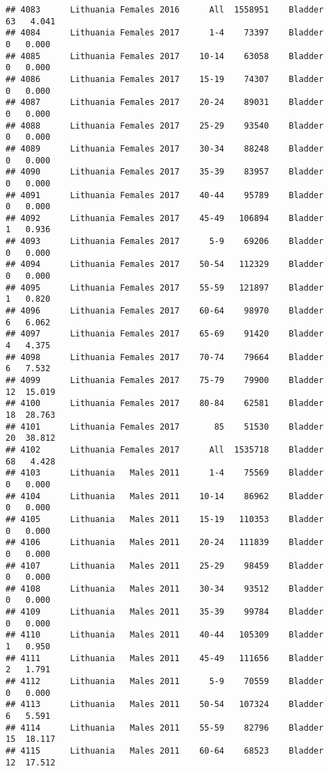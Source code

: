 \documentclass[
]{article}
\begin{document}
\begin{verbatim}
## 4083      Lithuania Females 2016      All  1558951    Bladder     63   4.041
## 4084      Lithuania Females 2017      1-4    73397    Bladder      0   0.000
## 4085      Lithuania Females 2017    10-14    63058    Bladder      0   0.000
## 4086      Lithuania Females 2017    15-19    74307    Bladder      0   0.000
## 4087      Lithuania Females 2017    20-24    89031    Bladder      0   0.000
## 4088      Lithuania Females 2017    25-29    93540    Bladder      0   0.000
## 4089      Lithuania Females 2017    30-34    88248    Bladder      0   0.000
## 4090      Lithuania Females 2017    35-39    83957    Bladder      0   0.000
## 4091      Lithuania Females 2017    40-44    95789    Bladder      0   0.000
## 4092      Lithuania Females 2017    45-49   106894    Bladder      1   0.936
## 4093      Lithuania Females 2017      5-9    69206    Bladder      0   0.000
## 4094      Lithuania Females 2017    50-54   112329    Bladder      0   0.000
## 4095      Lithuania Females 2017    55-59   121897    Bladder      1   0.820
## 4096      Lithuania Females 2017    60-64    98970    Bladder      6   6.062
## 4097      Lithuania Females 2017    65-69    91420    Bladder      4   4.375
## 4098      Lithuania Females 2017    70-74    79664    Bladder      6   7.532
## 4099      Lithuania Females 2017    75-79    79900    Bladder     12  15.019
## 4100      Lithuania Females 2017    80-84    62581    Bladder     18  28.763
## 4101      Lithuania Females 2017       85    51530    Bladder     20  38.812
## 4102      Lithuania Females 2017      All  1535718    Bladder     68   4.428
## 4103      Lithuania   Males 2011      1-4    75569    Bladder      0   0.000
## 4104      Lithuania   Males 2011    10-14    86962    Bladder      0   0.000
## 4105      Lithuania   Males 2011    15-19   110353    Bladder      0   0.000
## 4106      Lithuania   Males 2011    20-24   111839    Bladder      0   0.000
## 4107      Lithuania   Males 2011    25-29    98459    Bladder      0   0.000
## 4108      Lithuania   Males 2011    30-34    93512    Bladder      0   0.000
## 4109      Lithuania   Males 2011    35-39    99784    Bladder      0   0.000
## 4110      Lithuania   Males 2011    40-44   105309    Bladder      1   0.950
## 4111      Lithuania   Males 2011    45-49   111656    Bladder      2   1.791
## 4112      Lithuania   Males 2011      5-9    70559    Bladder      0   0.000
## 4113      Lithuania   Males 2011    50-54   107324    Bladder      6   5.591
## 4114      Lithuania   Males 2011    55-59    82796    Bladder     15  18.117
## 4115      Lithuania   Males 2011    60-64    68523    Bladder     12  17.512

\end{verbatim}
\end{document}
